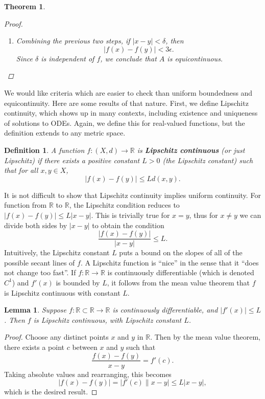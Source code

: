 \documentclass[12pt]{amsart}         %
\newtheorem{definition}{Definition}[section]
\newtheorem{theorem}{Theorem}[section]
\newtheorem{lemma}{Lemma}[section]
\theoremstyle{remark}
\newcommand{\R}{\mathbb{R}}
\begin{document}
\begin{theorem}
\begin{proof}
\begin{enumerate}
\[
\max_{j = 1, \dots, n(\epsilon)}|f_j^\epsilon(x) - f_j^\epsilon(y)| < \epsilon.
\]
\item Combining the previous two steps, if $|x - y| < \delta$, then
\[
|f(x) - f(y)| < 3 \epsilon.
\]
Since $\delta$ is independent of $f$, we conclude that $A$ is equicontinuous.
\end{enumerate}
\end{proof}
\end{theorem}

We would like criteria which are easier to check than uniform boundedness and equicontinuity. Here are some results of that nature. First, we define Lipschitz continuity, which shows up in many contexts, including existence and uniqueness of solutions to ODEs. Again, we define this for real-valued functions, but the definition extends to any metric space.

\begin{definition}
A function $f: (X, d) \rightarrow \R$ is \textbf{Lipschitz continuous} (or just Lipschitz) if there exists a positive constant $L > 0$ (the Lipschitz constant) such that for all $x, y \in X$,
\[
|f(x) - f(y)| \leq L d(x, y).
\]
\end{definition}
It is not difficult to show that Lipschitz continuity implies uniform continuity. For function from $\R$ to $\R$, the Lipschitz condition reduces to $|f(x) - f(y)| \leq L|x-y|$. This is trivially true for $x = y$, thus for $x \neq y$ we can divide both sides by $|x - y|$ to obtain the condition
\[
\frac{|f(x) - f(y)|}{|x-y|} \leq L.
\]
Intuitively, the Lipschitz constant $L$ puts a bound on the slopes of all of the possible secant lines of $f$. A Lipschitz function is ``nice'' in the sense that it ``does not change too fast''. If $f: \R \rightarrow \R$ is continuously differentiable (which is denoted $C^1$) and $f'(x)$ is bounded by $L$, it follows from the mean value theorem that $f$ is Lipschitz continuous with constant $L$. 

\begin{lemma}Suppose $f: \R\subset \R \rightarrow \R$ is continuously differentiable, and $|f'(x)| \leq L$. Then $f$ is Lipschitz continuous, with Lipschitz constant $L$. 
\end{lemma}
\begin{proof}
Choose any distinct points $x$ and $y$ in $\R$. Then by the mean value theorem, there exists a point $c$ between $x$ and $y$ such that
\[
\frac{f(x)-f(y)}{x-y} = f'(c).
\]
Taking absolute values and rearranging, this becomes
\[
|f(x)-f(y)| = |f'(c)\|x-y| \leq L |x-y|,
\]
which is the desired result.
\end{proof}
\end{document}
